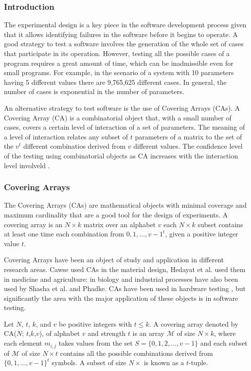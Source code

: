 \subsubsection{Introduction}
The experimental design is a key piece in the software development process given that it allows identifying failures in the software before it begins to operate. A good strategy to test a software involves the generation of the whole set of cases that participate in its operation. However, testing all the possible cases of a program requires a great amount of time, which can be inadmissible even for small programs\cite{Cohen:2003}. For example, in the scenario of a system with 10 parameters having 5 different values there are 9,765,625 different cases. In general, the number of cases is exponential in the number of parameters.

An alternative strategy to test software is the use of Covering Arrays (CAs). A Covering Array (CA) is a combinatorial object that, with a small number of cases, covers a certain level of interaction of a set of parameters. The meaning of a level of interaction relates any subset of $t$ parameters of a matrix to the set of the $v^{t}$ different combinatios derived from $v$ different values. The confidence level of the testing using combinatorial objects as CA increases with the interaction level involveld \cite{Kuhn:2008}.

\subsubsection{Covering Arrays}
The Covering Arrays (CAs) are mathematical objects with minimal coverage and maximum cardinality that are a good tool for the design of experiments. A covering array is an $N \times k$ matrix over an alphabet $v$ each $N \times k$ subset contains at least one time each combination from ${0,1,\ldots,v−1}^{t}$, given a positive integer value $t$.

Covering Arrays have been an object of study and application in different research areas. Cawse \cite{Cawse:2003} used CAs in the material design, Hedayat et al. \cite{Hedayat:1999} used them in medicine and agriculture; in biology and industrial processes have also been used by Shasha et al. \cite{Shasha:2001} and Phadke\cite{Phadke:1995}. CAs have been used in hardware testing \cite{Vadde:2004}, but significantly the area with the major application of these objects is in software testing\cite{Burr:1998,Yilmaz:2004}.

Let $N$, $t$, $k$, and $v$ be positive integers with $t \leq k$. A covering array denoted by CA($N$; $t$,$k$,$v$), of alphabet $v$ and strength $t$ is an array $\mathcal{M}$ of size $N \times k$, where each element $m_{i,j}$ takes values from the set $S = \{0,1,2,\ldots,v-1\}$ and each subset of $\mathcal{M}$ of size $N \times t$ contains all the possible combinations derived from $\{0,1,\ldots,v-1\}^{t}$ symbols. A subset of size $N \times $ is known as a $t$-tuple.

